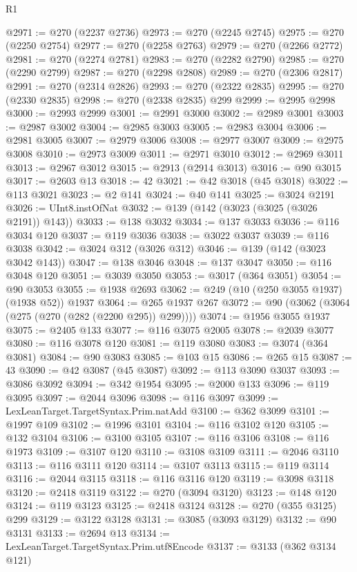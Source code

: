 \begin{lexlean}{R1}
\begin{coremodule}
@2971 := @270 (@2237 @2736)
@2973 := @270 (@2245 @2745)
@2975 := @270 (@2250 @2754)
@2977 := @270 (@2258 @2763)
@2979 := @270 (@2266 @2772)
@2981 := @270 (@2274 @2781)
@2983 := @270 (@2282 @2790)
@2985 := @270 (@2290 @2799)
@2987 := @270 (@2298 @2808)
@2989 := @270 (@2306 @2817)
@2991 := @270 (@2314 @2826)
@2993 := @270 (@2322 @2835)
@2995 := @270 (@2330 @2835)
@2998 := @270 (@2338 @2835) @299
@2999 := @2995 @2998
@3000 := @2993 @2999
@3001 := @2991 @3000
@3002 := @2989 @3001
@3003 := @2987 @3002
@3004 := @2985 @3003
@3005 := @2983 @3004
@3006 := @2981 @3005
@3007 := @2979 @3006
@3008 := @2977 @3007
@3009 := @2975 @3008
@3010 := @2973 @3009
@3011 := @2971 @3010
@3012 := @2969 @3011
@3013 := @2967 @3012
@3015 := @2913 (@2914 @3013)
@3016 := @90 @3015
@3017 := @2603 @13
@3018 := 42
@3021 := @42 @3018 (@45 @3018)
@3022 := @113 @3021
@3023 := @2 @141
@3024 := @40 @141
@3025 := @3024 @2191
@3026 := UInt8.instOfNat
@3032 := @139 (@142 (@3023 (@3025 (@3026 @2191)) @143))
@3033 := @138 @3032
@3034 := @137 @3033
@3036 := @116 @3034 @120
@3037 := @119 @3036
@3038 := @3022 @3037
@3039 := @116 @3038
@3042 := @3024 @312 (@3026 @312)
@3046 := @139 (@142 (@3023 @3042 @143))
@3047 := @138 @3046
@3048 := @137 @3047
@3050 := @116 @3048 @120
@3051 := @3039 @3050
@3053 := @3017 (@364 @3051)
@3054 := @90 @3053
@3055 := @1938 @2693
@3062 := @249 (@10 (@250 @3055 @1937) (@1938 @52)) @1937
@3064 := @265 @1937 @267
@3072 := @90 (@3062 (@3064 (@275 (@270 (@282 (@2200 @295)) @299))))
@3074 := @1956 @3055 @1937
@3075 := @2405 @133
@3077 := @116 @3075 @2005
@3078 := @2039 @3077
@3080 := @116 @3078 @120
@3081 := @119 @3080
@3083 := @3074 (@364 @3081)
@3084 := @90 @3083
@3085 := @103 @15
@3086 := @265 @15
@3087 := 43
@3090 := @42 @3087 (@45 @3087)
@3092 := @113 @3090 @3037
@3093 := @3086 @3092
@3094 := @342 @1954
@3095 := @2000 @133
@3096 := @119 @3095
@3097 := @2044 @3096
@3098 := @116 @3097
@3099 := LexLeanTarget.TargetSyntax.Prim.natAdd
@3100 := @362 @3099
@3101 := @1997 @109
@3102 := @1996 @3101
@3104 := @116 @3102 @120
@3105 := @132 @3104
@3106 := @3100 @3105
@3107 := @116 @3106
@3108 := @116 @1973
@3109 := @3107 @120
@3110 := @3108 @3109
@3111 := @2046 @3110
@3113 := @116 @3111 @120
@3114 := @3107 @3113
@3115 := @119 @3114
@3116 := @2044 @3115
@3118 := @116 @3116 @120
@3119 := @3098 @3118
@3120 := @2418 @3119
@3122 := @270 (@3094 @3120)
@3123 := @148 @120
@3124 := @119 @3123
@3125 := @2418 @3124
@3128 := @270 (@355 @3125) @299
@3129 := @3122 @3128
@3131 := @3085 (@3093 @3129)
@3132 := @90 @3131
@3133 := @2694 @13
@3134 := LexLeanTarget.TargetSyntax.Prim.utf8Encode
@3137 := @3133 (@362 @3134 @121)

\end{coremodule}
\end{lexlean}
